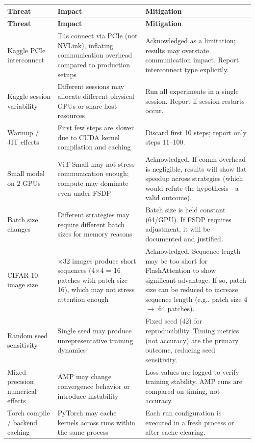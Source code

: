 \documentclass[12pt, a4paper]{article}
\begin{document}
\begin{singlespace}
\small
\begin{longtable}{>{\raggedright\arraybackslash}p{3.5cm} >{\raggedright\arraybackslash}p{4.5cm} >{\raggedright\arraybackslash}p{5.5cm}}
\toprule
\textbf{Threat} & \textbf{Impact} & \textbf{Mitigation} \\
\midrule
\endfirsthead
\toprule
\textbf{Threat} & \textbf{Impact} & \textbf{Mitigation} \\
\midrule
\endhead
\bottomrule
\endfoot

Kaggle PCIe interconnect & T4s connect via PCIe (not NVLink), inflating communication overhead compared to production setups & Acknowledged as a limitation; results may overstate communication impact. Report interconnect type explicitly. \\
\midrule
Kaggle session variability & Different sessions may allocate different physical GPUs or share host resources & Run all experiments in a single session. Report if session restarts occur. \\
\midrule
Warmup / JIT effects & First few steps are slower due to CUDA kernel compilation and caching & Discard first 10 steps; report only steps 11--100. \\
\midrule
Small model on 2 GPUs & ViT-Small may not stress communication enough; compute may dominate even under FSDP & Acknowledged. If comm overhead is negligible, results will show flat speedup across strategies (which would refute the hypothesis---a valid outcome). \\
\midrule
Batch size changes & Different strategies may require different batch sizes for memory reasons & Batch size is held constant (64/GPU). If FSDP requires adjustment, it will be documented and justified. \\
\midrule
CIFAR-10 image size & 32$\times$32 images produce short sequences (4$\times$4 = 16 patches with patch size 16), which may not stress attention enough & Acknowledged. Sequence length may be too short for FlashAttention to show significant advantage. If so, patch size can be reduced to increase sequence length (e.g., patch size 4 $\rightarrow$ 64 patches). \\
\midrule
Random seed sensitivity & Single seed may produce unrepresentative training dynamics & Fixed seed (42) for reproducibility. Timing metrics (not accuracy) are the primary outcome, reducing seed sensitivity. \\
\midrule
Mixed precision numerical effects & AMP may change convergence behavior or introduce instability & Loss values are logged to verify training stability. AMP runs are compared on timing, not accuracy. \\
\midrule
Torch compile / backend caching & PyTorch may cache kernels across runs within the same process & Each run configuration is executed in a fresh process or after cache clearing. \\

\end{longtable}
\end{singlespace}
\end{document}
